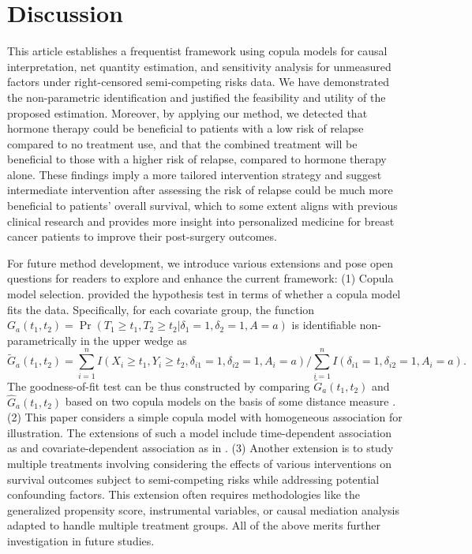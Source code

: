 \documentclass[aoas]{imsart}
\theoremstyle{plain}
\def\Pr{\operatorname{Pr}}
\begin{document}
\section{Discussion}
\label{sec:conclusion}



This article establishes a frequentist framework using copula models for causal interpretation, net quantity estimation, and sensitivity analysis for unmeasured factors under right-censored semi-competing risks data. We have demonstrated the non-parametric identification and justified the feasibility and utility of the proposed estimation. Moreover, by applying our method, we detected that hormone therapy could be beneficial to patients with a low risk of relapse compared to no treatment use, and that the combined treatment will be beneficial to those with a higher risk of relapse, compared to hormone therapy alone. These findings imply a more tailored intervention strategy and suggest intermediate intervention after assessing the risk of relapse could be much more beneficial to patients' overall survival, which to some extent aligns with previous clinical research \citep{sledge2014} and provides more insight into personalized medicine for breast cancer patients to improve their post-surgery outcomes. %




For future method development, we introduce various extensions and pose open questions for readers to explore and enhance the current framework:  (1) Copula model selection. \cite{hsieh2008} provided the hypothesis test in terms of whether a copula model fits the data. Specifically, for each covariate group, the function $G_a(t_1,t_2) = \Pr(T_1\geq t_1, T_2\geq t_2|\delta_1 = 1,\delta_2 = 1, A=a)$ is identifiable non-parametrically in the upper wedge as
$$\widetilde{G}_a (t_1,t_2)= \sum\limits_{i=1}^n I(X_i\geq t_1, Y_i\geq t_2,\delta_{i1}=1,\delta_{i2}=1,A_i=a)/\sum\limits_{i=1}^n I(\delta_{i1}=1,\delta_{i2}=1,A_i=a).$$
% 
The goodness-of-fit test can be thus constructed by comparing $\widetilde{G}_a(t_1,t_2)$ and $\widehat{G}_a(t_1,t_2)$ based on two copula models on the basis of some distance measure \citep{hsieh2008}. (2) This paper considers a simple copula model with homogeneous association for illustration.  The extensions of such a model include time-dependent association as \cite{peng2007semicompeting} and covariate-dependent association as in \cite{li2015}. (3) Another extension is to study multiple treatments
involving considering the effects of various interventions on survival outcomes subject to semi-competing risks while addressing potential confounding factors. This extension often requires methodologies like the generalized propensity score, instrumental variables, or causal mediation analysis adapted to handle multiple treatment groups. 
All of the above merits further investigation in future studies.
\end{document}
